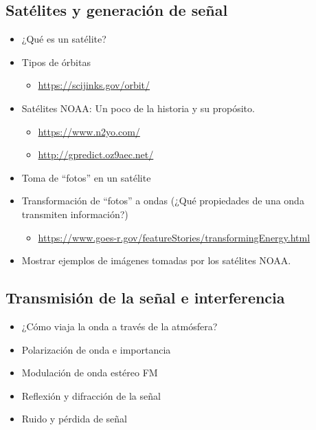 \subsection{Satélites y generación de señal}
\begin{itemize}
    \item ¿Qué es un satélite?
    \item Tipos de órbitas
          \begin{itemize}
              \item \url{https://scijinks.gov/orbit/}
          \end{itemize}
    \item Satélites NOAA: Un poco de la historia y su propósito.
          \begin{itemize}
              \item \url{https://www.n2yo.com/}
              \item \url{http://gpredict.oz9aec.net/}
          \end{itemize}
    \item Toma de “fotos” en un satélite
    \item Transformación de “fotos” a ondas (¿Qué propiedades de una onda transmiten información?)
          \begin{itemize}
              \item \url{https://www.goes-r.gov/featureStories/transformingEnergy.html}
          \end{itemize}
    \item Mostrar ejemplos de imágenes tomadas por los satélites NOAA.
\end{itemize}

\subsection{Transmisión de la señal e interferencia}
\begin{itemize}
    \item ¿Cómo viaja la onda a través de la atmósfera?
    \item Polarización de onda e importancia
    \item Modulación de onda estéreo FM
    \item Reflexión y difracción de la señal
    \item Ruido y pérdida de señal
\end{itemize}

